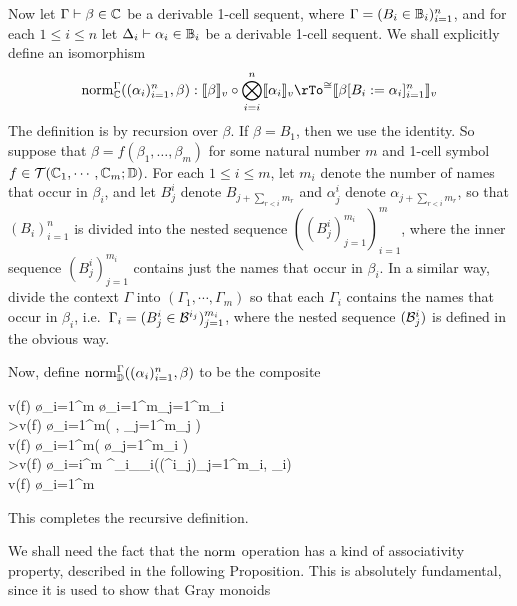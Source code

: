 \documentclass{robinthesisdraft}
\begin{document}
%
\begin{definition}
	Now let $\Gamma\vdash \beta\in\mathbb{C}$ be a derivable 1-cell sequent, where
	$\Gamma = (B_{i}\in\mathbb{B}_{i})_{i=1}^{n}$, and for each $1\leq i\leq n$
	let $\Delta_{i}\vdash \alpha_{i}\in\mathbb{B}_{i}$ be a derivable 1-cell sequent.
	We shall explicitly define an isomorphism
	\[
		\norm_{\C}^{\Gamma}((\alpha_{i})_{i=1}^{n},\beta)
			: \semint{\beta}\o\Tn_{i=i}^{n}\semint{\alpha_{i}}
			\rTo^{\cong}
			\semint{\beta[B_{i}:=\alpha_{i}]_{i=1}^{n}}
	\]
	The definition is by recursion over $\beta$. If $\beta = B_{1}$, then
	we use the identity. So suppose that $\beta = f(\beta_{1}, \dots, \beta_{m})$
	for some natural number $m$ and 1-cell symbol $f\in{\mathcal{T}}(\mathbb{C}_{1},\cdots,\mathbb{C}_{m};\mathbb{D})$.
	For each $1\leq i\leq m$, let $m_{i}$ denote the
	number of names that occur in $\beta_{i}$, and let $B^{i}_{j}$
	denote $B_{j+\sum_{r<i}m_{r}}$ and $\alpha^{i}_{j}$ denote
	$\alpha_{j+\sum_{r<i}m_{r}}$, so that $(B_{i})_{i=1}^{n}$ is divided
	into the nested sequence $((B^{i}_{j})_{j=1}^{m_{i}})_{i=1}^{m}$,
	where the inner sequence $(B^{i}_{j})_{j=1}^{m_{i}}$ contains just
	the names that occur in $\beta_{i}$. In a similar way, divide the
	context $\Gamma$ into $(\Gamma_{1}, \cdots, \Gamma_{m})$ so that
	each $\Gamma_{i}$ contains the names that occur in $\beta_{i}$,
	i.e.\ $\Gamma_{i} = (B^{i}_{j}\in\mathcal{B}^{i_{j}})_{j=1}^{m_{i}}$, where
	the nested sequence $(\mathcal{B}^{i}_{j})$ is defined in the obvious way.

	Now, define $\mathrm{norm}^{\Gamma}_{\mathbb{D}}((\alpha_{i})_{i=1}^{n},\beta)$
	to be the composite
	\begin{diagram}
		v(f) \o \Tn_{i=1}^{m} \o \Tn_{i=1}^{m}\Tn_{j=1}^{m_{i}}
		\\
		\dTo>{v(f) \o \Ic_{i=1}^{m}( , \Tn_{j=1}^{m_{j}} )}
		\\
		v(f) \o \Tn_{i=1}^{m}(  \o \Tn_{j=1}^{m_{i}} )
		\\
		\dTo>{v(f) \o \Tn_{i=i}^{m} \norm^{\Gamma_{i}}_{\C_{i}}((\alpha^{i}_{j})_{j=1}^{m_{i}}, \beta_{i})}
		\\
		v(f) \o \Tn_{i=1}^{m}
	\end{diagram}
	This completes the recursive definition.
\end{definition}
We shall need the fact that the $\mathrm{norm}$ operation has a kind of
associativity property, described in the following Proposition.
This is absolutely fundamental, since it is used to show that Gray monoids
\end{document}
